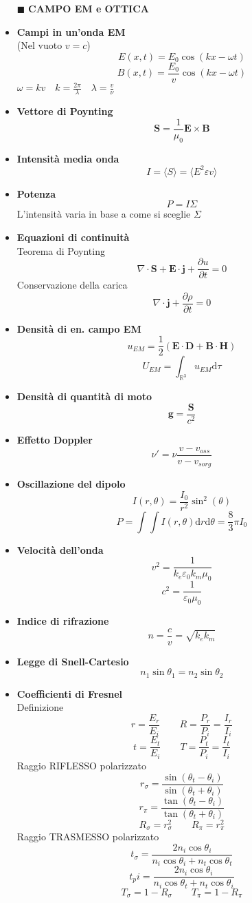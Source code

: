 \documentclass{book}
\newcommand{\g}{\textbf}
\newcommand{\h}{\mathbf}
\newcommand{\e}{\begin{equation}}
\newcommand{\ex}{\end{equation} }
\renewcommand{\it}{\item[$\cdot$]}
\begin{document}
\begin{multicols}{4}
\begin{itemize}
\item [$\blacksquare$] \g{CAMPO EM e OTTICA}
    \it \g{Campi in un'onda EM} \\
        (Nel vuoto $v=c$)
        \e{E(x,t)=E_0\cos(kx-\omega t)} \ex
        \e{B(x,t)=\frac{E_0}{v}\cos(kx-\omega t)} \ex
        $\omega=kv \quad k=\frac{2\pi}{\lambda} \quad \lambda=\frac{v}{\nu}$ \\
    \it \g{Vettore di Poynting}
        \e{\h{S}=\frac{1}{\mu_0}\h{E}\times\h{B}} \ex
    \it \g{Intensità media onda}
        \e{I=\langle S\rangle=\langle E^2\varepsilon v\rangle} \ex
    \it \g{Potenza}
        \e{P=I\Sigma} \ex
        L'intensità varia in base a come si sceglie $\Sigma$ \\
    \it \g{Equazioni di continuità} \\
        Teorema di Poynting
        \e{\nabla\cdot \h{S}+\h{E}\cdot\h{j}+\frac{\partial u}{\partial t}=0 } \ex
        Conservazione della carica
        \e{\nabla\cdot\h{j}+\frac{\partial \rho}{\partial t}=0} \ex
    \it \g{Densità di en. campo EM}
        \e{u_{EM}=\frac{1}{2}(\h{E}\cdot\h{D}+\h{B}\cdot\h{H})} \ex
        \e{U_{EM}=\int_{\mathbb{R}^3}u_{EM} \mathrm{d}\tau} \ex
    \it \g{Densità di quantità di moto}
        \e{\h{g}=\frac{\h{S}}{c^2}} \ex
    \it \g{Effetto Doppler}
        \e{\nu'=\nu\frac{v-v_{oss}}{v-v_{sorg}}} \ex
    \it \g{Oscillazione del dipolo}
        \e{I(r,\theta)=\frac{I_0}{r^2}\sin^2(\theta)} \ex
        \e{P=\int \int I(r,\theta) \mathrm{d}r \mathrm{d}\theta=\frac{8}{3}\pi I_0}\ex
    \it \g{Velocità dell'onda}
        \e{v^2=\frac{1}{k_e \varepsilon_0 k_m \mu_0}} \ex
        \e{c^2=\frac{1}{\varepsilon_0 \mu_0}} \ex
    \it \g{Indice di rifrazione}
        \e{n=\frac{c}{v}=\sqrt{k_ek_m}} \ex
    \it \g{Legge di Snell-Cartesio}
        \e{n_1 \sin\theta_1=n_2 \sin\theta_2} \ex
    \it \g{Coefficienti di Fresnel} \\
        Definizione
        \e{r=\frac{E_r}{E_i} \qquad R=\frac{P_r}{P_i}=\frac{I_r}{I_i}} \ex
        \e{t=\frac{E_t}{E_i} \qquad T=\frac{P_t}{P_i}=\frac{I_t}{I_i}} \ex
        Raggio RIFLESSO polarizzato
        \e{r_\sigma=\frac{\sin(\theta_t-\theta_i)}{\sin(\theta_t+\theta_i)}} \ex
        \e{r_\pi=\frac{\tan(\theta_t-\theta_i)}{\tan(\theta_t+\theta_i)}} \ex
        \e{R_\sigma=r_\sigma^2 \qquad R_\pi=r_\pi^2} \ex
        Raggio TRASMESSO polarizzato
        \e{t_\sigma=\frac{2n_i\cos\theta_i}{n_i\cos\theta_i+n_t\cos\theta_t}} \ex
        \e{t_pi=\frac{2n_i\cos\theta_i}{n_i\cos\theta_t+n_t\cos\theta_i}} \ex
        \e{T_\sigma=1-R_\sigma \qquad T_\pi=1-R_\pi} \ex

\end{itemize}
\end{multicols}
\end{document}

